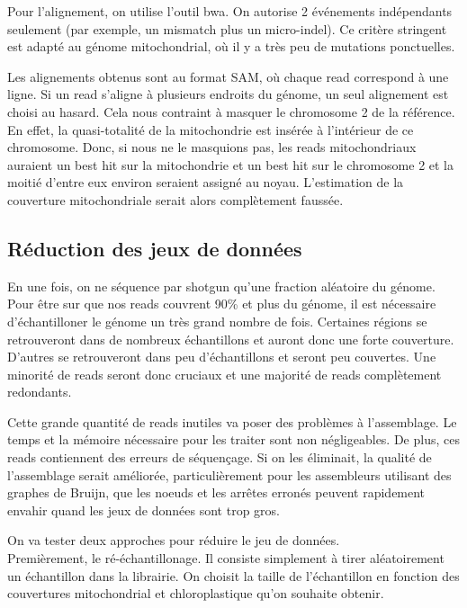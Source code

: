 \documentclass[a4paper]{article}
\begin{document}
Pour l'alignement, on utilise l'outil bwa. On autorise 2 événements indépendants seulement (par exemple, un mismatch plus un micro-indel). Ce critère stringent est adapté au génome mitochondrial, où il y a très peu de mutations ponctuelles.

Les alignements obtenus sont au format SAM, où chaque read correspond à une ligne. Si un read s'aligne à plusieurs endroits du génome, un seul alignement est choisi au hasard. Cela nous contraint à masquer le chromosome 2 de la référence. En effet,  la quasi-totalité de la mitochondrie est insérée à l'intérieur de ce chromosome.\cite{chr2} Donc, si nous ne le masquions pas, les reads mitochondriaux auraient un best hit sur la mitochondrie et un best hit sur le chromosome 2 et la moitié d'entre eux environ seraient assigné au noyau. L'estimation de la couverture mitochondriale serait alors complètement faussée. 

\subsection{Réduction des jeux de données}

En une fois, on ne séquence par shotgun qu'une fraction aléatoire du génome. Pour être sur que nos reads couvrent 90\% et plus du génome, il est nécessaire d'échantilloner le génome un très grand nombre de fois. Certaines régions se retrouveront dans de nombreux échantillons et auront donc une forte couverture. D'autres se retrouveront dans peu d'échantillons et seront peu couvertes. Une minorité de reads seront donc cruciaux et une majorité de reads complètement redondants. 

Cette grande quantité de reads inutiles va poser des problèmes à l'assemblage. Le temps et la mémoire nécessaire pour les traiter sont non négligeables. De plus, ces reads contiennent des erreurs de séquençage. Si on les éliminait, la qualité de l'assemblage serait améliorée, particulièrement pour les assembleurs utilisant des graphes de Bruijn, que les noeuds et les arrêtes erronés peuvent rapidement envahir quand les jeux de données sont trop gros.

On va tester deux approches pour réduire le jeu de données. \\

Premièrement, le ré-échantillonage. Il consiste simplement à tirer aléatoirement un échantillon dans la librairie. On choisit la taille de l'échantillon en fonction des couvertures mitochondrial et chloroplastique qu'on souhaite obtenir.
\end{document}
